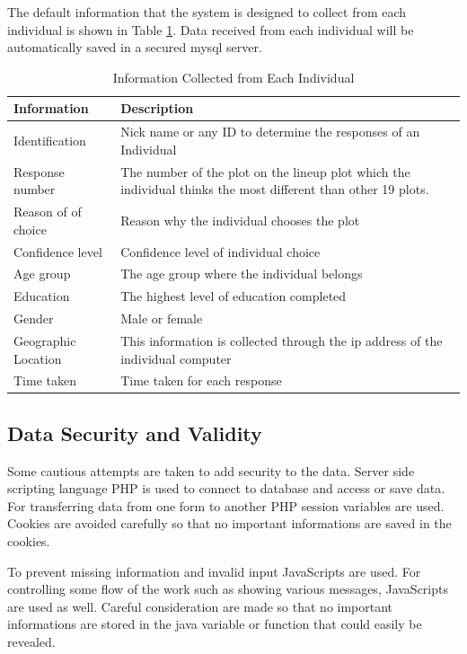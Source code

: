 \documentclass[11pt]{article}
\begin{document}
The default information that the system is designed to collect from each individual is shown in Table \ref{tbl:data_info}. Data received from each individual will be automatically saved in a secured mysql server. 

\begin{table}[hbtp]
\caption{Information Collected from Each Individual}
\centering 
\begin{tabular}{lp{8cm}} 
\hline
Information &  Description \\ %
\hline
Identification & Nick name or any ID to determine the responses of an Individual \\
Response number & The number of the plot on the lineup plot which the individual thinks the most different than other 19 plots.\\ 
Reason of of choice & Reason why the individual chooses the plot \\
Confidence level & Confidence level of individual choice \\ 
Age group& The age group where the individual belongs \\
Education & The highest level of education completed \\
Gender & Male or female \\
Geographic Location & This information is collected through the ip address of the individual computer \\ 
Time taken & Time taken for each response\\
\hline
\end{tabular}
\label{tbl:data_info}
\end{table}	




\subsection{Data Security and Validity} 

Some cautious attempts are taken to add security to the data. Server side scripting language PHP is used to connect to database and access or save data. For transferring data from one form to another PHP session variables are used. Cookies are avoided carefully so that no important informations are saved in the cookies. 

To prevent missing information and invalid input JavaScripts are used. For controlling some flow of the work such as showing various messages, JavaScripts are used as well. Careful consideration are made so that no important informations are stored in the java variable or function that could easily be revealed.
\end{document}
